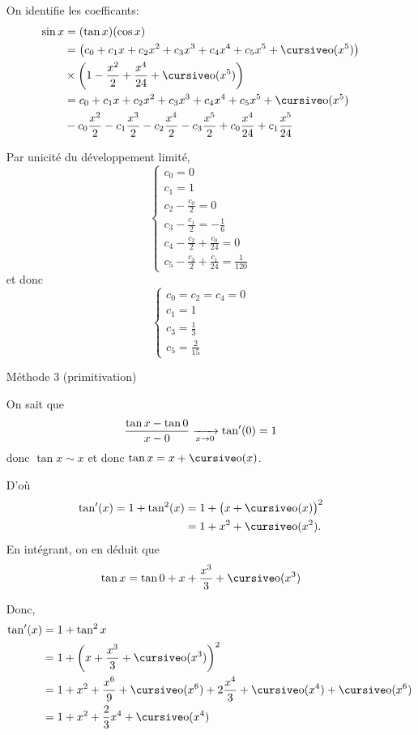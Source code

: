 \begin{exo}
\begin{itemize}
			On identifie les coefficants: 
			\begin{align*}
				\sin x &= (\tan x)(\cos x)\\
				&= \big(c_0 + c_1x + c_2x^2 + c_3x^3 + c_4x^4 + c_5x^5 + \po(x^5)\big)\\
				&\times \left( 1 - \frac{x^2}{2} + \frac{x^4}{24} + \po(x^5) \right)\\
				&= c_0 + c_1x + c_2 x^2 + c_3x^3 + c_4x^4 + c_5x^5 + \po(x^5)\\
				&- c_0 \frac{x^2}{2}-c_1 \frac{x^3}{2} - c_2 \frac{x^4}{2} - c_3 \frac{x^5}{2} + c_0\frac{x^4}{24} + c_1 \frac{x^5}{24} \\
			\end{align*}

			Par unicité du développement limité, \[
				\begin{cases}
					c_0 = 0\\
					c_1 = 1\\
					c_2 - \frac{c_0}{2} = 0\\
					c_3 - \frac{c_1}{2} = -\frac{1}{6}\\
					c_4 - \frac{c_2}{2} + \frac{c_0}{24} = 0\\
					c_5 - \frac{c_3}{2} + \frac{c_1}{24} = \frac{1}{120}
				\end{cases}
			\] et donc \[
				\begin{cases}
					c_0 = c_2 = c_4 = 0\\
					c_1 = 1\\
					c_3 = \frac{1}{3}\\
					c_5 = \frac{2}{15}
				\end{cases}
			\]
		\item[\sc Méthode 3](primitivation)

			On sait que \[
				\frac{\tan x - \tan 0}{x - 0} \xrightarrow[x\to 0]{} \tan'(0) = 1
			\] donc $\tan x \sim x$ et donc $\tan x = x + \po(x)$.

			D'où
			\begin{align*}
				\tan'(x) = 1 + \tan^2(x) &= 1 + \big(x + \po(x)\big)^2 \\
				&= 1 + x^2 + \po(x^2). \\
			\end{align*}
			En intégrant, on en déduit que \[
				\tan x = \tan 0 + x + \frac{x^3}{3} + \po(x^3)
			\]

			Donc,
			\begin{align*}
				\tan'(x) &= 1 + \tan^2 x \\
				&= 1 + \left( x + \frac{x^3}{3} + \po(x^3) \right)^2 \\
				&= 1 + x^2 + \frac{x^6}{9} + \po(x^6) + 2 \frac{x^4}{3} + \po(x^4) + \po(x^6) \\
				&= 1 + x^2 + \frac{2}{3}x^4 + \po(x^4) \\
			\end{align*}


\end{itemize}
\end{exo}

